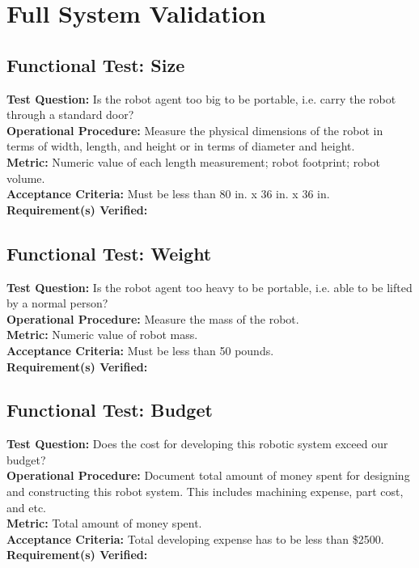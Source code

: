 
\section{Full System Validation}
\label{sec:system_validation}

\subsection{Functional Test: Size}
\label{test:sys_ft_size}
\textbf{Test Question:} Is the robot agent too big to be portable, i.e. carry the robot through a standard door?\\
\textbf{Operational Procedure:} Measure the physical dimensions of the robot in terms of width, length, and height or in terms of diameter and height. \\
\textbf{Metric:} Numeric value of each length measurement; robot footprint; robot volume.\\
\textbf{Acceptance Criteria:} Must be less than 80 in. x 36 in. x 36 in. \\
\textbf{Requirement(s) Verified:} 

\subsection{Functional Test: Weight}
\label{test:sys_ft_weight}
\textbf{Test Question:} Is the robot agent too heavy to be portable, i.e. able to be lifted by a normal person?\\
\textbf{Operational Procedure:} Measure the mass of the robot. \\
\textbf{Metric:} Numeric value of robot mass.\\
\textbf{Acceptance Criteria:} Must be less than 50 pounds. \\
\textbf{Requirement(s) Verified:} 

\subsection{Functional Test: Budget}
\label{test:sys_ft_budget}
\textbf{Test Question:} Does the cost for developing this robotic system exceed our budget?\\
\textbf{Operational Procedure:} Document total amount of money spent for designing and constructing this robot system. This includes machining expense, part cost, and etc. \\
\textbf{Metric:} Total amount of money spent.\\
\textbf{Acceptance Criteria:} Total developing expense has to be less than \$2500. \\
\textbf{Requirement(s) Verified:} 

